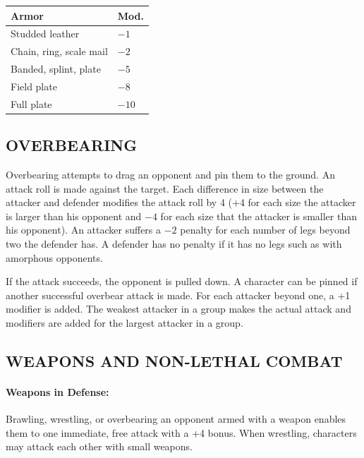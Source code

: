 \begin{multicols}{2}
\noindent
\begin{minipage}{\columnwidth}

\label{wrestlingarmor}
\noindent
\begin{tabular}{|p{}|p{}|}
\hline
Armor	& Mod. \\
\hline\hline
\rowcolor[gray]{.9}Studded leather	& $-1$ \\
Chain, ring, scale mail	& $-2$ \\
\rowcolor[gray]{.9}Banded, splint, plate	& $-5$ \\
Field plate	& $-8$ \\
\rowcolor[gray]{.9}Full plate	& $-10$ \\
\hline
\end{tabular}

\end{minipage}
 
\subsection{OVERBEARING}

Overbearing attempts to drag an opponent and pin them to the ground.  An attack roll is made against the target.  Each difference in size between the attacker and defender modifies the attack roll by 4 (+4 for each size the attacker is larger than his opponent and $-4$ for each size that the attacker is smaller than his opponent).  An attacker suffers a $-2$ penalty for each number of legs beyond two the defender has.  A defender has no penalty if it has no legs such as with amorphous opponents.

If the attack succeeds, the opponent is pulled down.  A character can be pinned if another successful overbear attack is made.  For each attacker beyond one, a +1 modifier is added.  The weakest attacker in a group makes the actual attack and modifiers are added for the largest attacker in a group.

\subsection{WEAPONS AND NON-LETHAL COMBAT}

\paragraph{Weapons in Defense:} Brawling, wrestling, or overbearing an opponent armed with a weapon enables them to one immediate, free attack with a +4 bonus.  When wrestling, characters may attack each other with small weapons.


\end{multicols}
